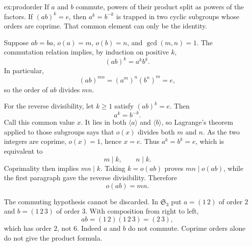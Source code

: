 \begin{solution}{ex:prodorder}
\idea If $a$ and $b$ commute, powers of their product split as powers of the factors. If $(ab)^k=e$, then $a^k=b^{-k}$ is trapped in two cyclic subgroups whose orders are coprime. That common element can only be the identity.

\writeup Suppose $ab=ba$, $o(a)=m$, $o(b)=n$, and $\gcd(m,n)=1$. The commutation relation implies, by induction on positive $k$,
\[
(ab)^k=a^kb^k.
\]
In particular,
\[
(ab)^{mn}=(a^m)^n(b^n)^m=e,
\]
so the order of $ab$ divides $mn$.

For the reverse divisibility, let $k\ge1$ satisfy $(ab)^k=e$. Then
\[
a^k=b^{-k}.
\]
Call this common value $x$. It lies in both $\langle a\rangle$ and $\langle b\rangle$, so Lagrange's theorem applied to those subgroups says that $o(x)$ divides both $m$ and $n$. As the two integers are coprime, $o(x)=1$, hence $x=e$. Thus $a^k=b^k=e$, which is equivalent to
\[
m\mid k,\qquad n\mid k.
\]
Coprimality then implies $mn\mid k$. Taking $k=o(ab)$ proves $mn\mid o(ab)$, while the first paragraph gave the reverse divisibility. Therefore
\[
\boxed{o(ab)=mn}.
\]

The commuting hypothesis cannot be discarded. In $\mathfrak S_3$ put $a=(1\,2)$ of order $2$ and $b=(1\,2\,3)$ of order $3$. With composition from right to left,
\[
ab=(1\,2)(1\,2\,3)=(2\,3),
\]
which has order $2$, not $6$. Indeed $a$ and $b$ do not commute. Coprime orders alone do not give the product formula.
\end{solution}

